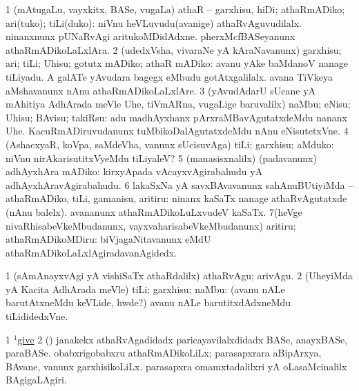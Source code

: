 \noindent
\gl{\sakirx}
\expl{}
\bmng
\bnum
\num{1} (mAtugaLu, vayxkitx, BASe, \mo vugaLa) athaR -- garxhisu, hiDi; athaRmADiko; ari(tuko); tiLi(duko):  niVnu heVLuvudu(avanige) athaRvAguvudilalx.  ninanxnunx pUNaRvAgi aritukoMDidAdxne.  pherxMcfBASeyanunx athaRmADikoLaLxlAra. 
\num{2} (udedxVsha, vivaraNe yA kAraNavanunx) garxhisu; ari; tiLi; Uhisu; gotutx mADiko; athaR mADiko:  avanu yAke baMdanoV nanage tiLiyadu.  A galATe yAvudara bagegx eMbudu gotAtxgalilalx.  avana TiVkeya aMshavanunx nAnu athaRmADikoLaLxlAre. 
\num{3} (yAvudAdarU sUcane yA mAhitiya AdhArada meVle Uhe, tiVmARna, \mo vugaLige baruvalilx) naMbu; eNisu; Uhisu; BAvisu; takiRsu:  adu madhAyxhanx pArxraMBavAgutatxdeMdu nananx Uhe.  KacuRmADiruvudanunx tuMbikoDalAgutatxdeMdu nAnu eNisutetxVne. 
\num{4} (AshacxyaR, koVpa, saMdeVha, \mo vanunx sUcisuvAga) tiLi; garxhisu; aMduko:  niVnu nirAkarisutitxVyeMdu tiLiyaleV? 
\num{5} (manasisxnalilx) (padavanunx) adhAyxhAra mADiko:  kirxyApada vAcayxvAgirabahudu yA adhAyxhAravAgirabahudu. 
\num{6} lakaSxNa yA savxBAvavanunx sahAnuBUtiyiMda -- athaRmADiko, tiLi, gamanisu, aritiru:  ninanx kaSaTx nanage athaRvAgutatxde (nAnu balelx).  avananunx athaRmADikoLuLxvudeV kaSaTx. 
\num{7}(heVge nivaRhisabeVkeMbudanunx, vayxvaharisabeVkeMbudanunx) aritiru; athaRmADikoMDiru:  biVjagaNitavanunx eMdU athaRmADikoLaLxlAgiradavanAgidedx. 
\enum
\emng

\noindent
\gl{\akirx}
\expl{}
\bmng
\bnum
\num{1} (sAmAnayxvAgi yA vishiSaTx athaRdalilx) athaRvAgu; arivAgu. 
\num{2} (UheyiMda yA Kacita AdhArada meVle) tiLi; garxhisu; naMbu:  (avanu nALe barutAtxneMdu keVLide, hwde?) avanu nALe barutitxdAdxneMdu tiLididedxVne. 
\enum
\emng

\noindent
\gl{\pagu}
\expl{}
\bmng
\bnum
\num{1} \hyperref{kandict_g.pdf}{G}{give(1) pagu(16)}{$^1$give}  
\num{2}  (\pArxparx) janakekx athaRvAgadidadx paricayavilalxdidadx BASe, anayxBASe, paraBASe. 
  
\banum
{} obabxrigobabxru athaRmADikoLiLx; parasapxrara aBipArxya, BAvane, \mo vanunx garxhisikoLiLx. 
 parasapxra omamxtadalilxri yA oLasaMcinalilx BAgigaLAgiri. 
\eanum
\numie
\enum
\emng
\eentry

